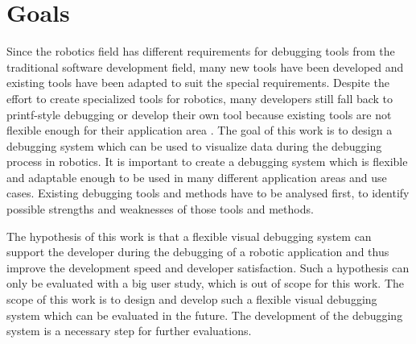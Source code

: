 
\section{Goals}
Since the robotics field has different requirements for debugging tools from the traditional software development field, many new tools have been developed and existing tools have been adapted to suit the special requirements. Despite the effort to create specialized tools for robotics, many developers still fall back to printf-style debugging or develop their own tool because existing tools are not flexible enough for their application area \cite{Collett2010}. The goal of this work is to design a debugging system which can be used to visualize data during the debugging process in robotics. It is important to create a debugging system which is flexible and adaptable enough to be used in many different application areas and use cases. Existing debugging tools and methods have to be analysed first, to identify possible strengths and weaknesses of those tools and methods.

The hypothesis of this work is that a flexible visual debugging system can support the developer during the debugging of a robotic application and thus improve the development speed and developer satisfaction. Such a hypothesis can only be evaluated with a big user study, which is out of scope for this work. The scope of this work is to design and develop such a flexible visual debugging system which can be evaluated in the future. The development of the debugging system is a necessary step for further evaluations.


